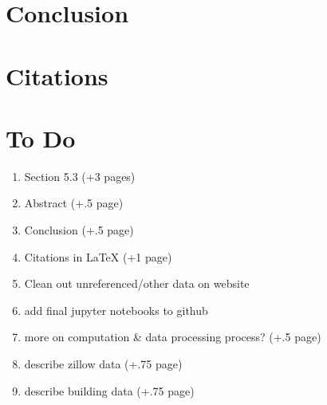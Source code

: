\documentclass{article}
\theoremstyle{definition}
\theoremstyle{remark}
\begin{document}
\section{Conclusion}
\section{Citations}
\section{To Do}
\begin{enumerate}
\item Section 5.3 (+3 pages)
\item Abstract (+.5 page)
\item Conclusion (+.5 page)
\item Citations in LaTeX (+1 page)
\item Clean out unreferenced/other data on website
\item add final jupyter notebooks to github
\item more on computation \& data processing process? (+.5 page)
\item describe zillow data (+.75 page)
\item describe building data (+.75 page)
\end{enumerate}
\end{document}
